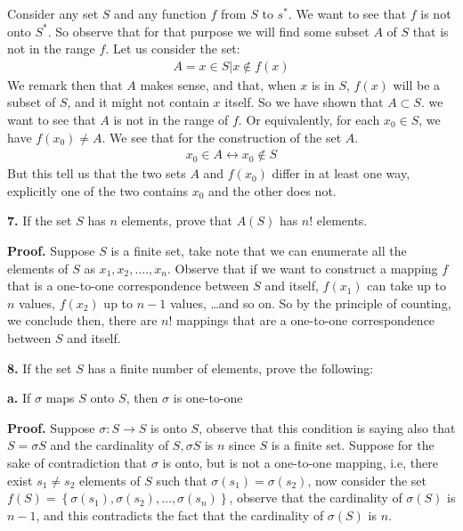 \documentclass[11pt,a4paper]{article}
\begin{document}
Consider any set $S$ and any function $f$ from $S$ to $s^*$. We want to see that $f$ is not onto $S^*$. So observe that for that purpose we will find some subset $A$ of $S$ that is not in the range $f$.
Let us consider the set:
\begin{align*}
A = { x \in S \vert x \not\in f(x)}
\end{align*} 
We remark then that $A$ makes sense, and that, when $x$ is in $S$, $f(x)$ will be a subset of $S$, and it might not contain $x$ itself.
So we have shown that $A \subset S$. we want to see that $A$ is not in the range of $f$. Or equivalently, for each $x_0 \in S$, we have $ f(x_0) \neq A$. We see that for the construction of the set $A$.
\begin{align*}
x_0 \in A \leftrightarrow x_0 \not\in S 
\end{align*}
But this tell us that the two sets $A$ and $f(x_0)$ differ in at least one way, explicitly one of the two contains $x_0$ and the other does not. \par 
\textbf{7.} If the set $S$ has $n$ elements, prove that $A(S)$ has $ n!$ elements. \par  
\textbf{Proof.} Suppose $S$ is a finite set, take note that we can enumerate all the elements of $S$ as $ x_1, x_2,....,x_n$. Observe that if we want to construct a mapping $f$ that is a one-to-one correspondence between $S$ and itself, $f(x_1)$ can take up to $n$ values, $f(x_2)$ up to $n-1$ values, \ldots and so on. So by the principle of counting, we conclude then, there are $n!$ mappings that are a one-to-one correspondence between $S$ and itself. \par 
\textbf{8.} If the set $S$ has a finite number of elements, prove the following: \par
\textbf{a.} If $ \sigma$ maps $S$ onto $S$, then $\sigma$ is one-to-one \par
\textbf{Proof.} Suppose $ \sigma : S \rightarrow S $ is onto $S$, observe that this condition is saying also that $S = \sigma S$ and the cardinality of $ S, \sigma S $ is $n$ since $S$  is a finite set. Suppose for the sake of contradiction that $ \sigma $ is onto, but is not a one-to-one mapping, i.e, there exist $s_1 \neq s_2$ elements of $S$ such that $ \sigma(s_1) = \sigma(s_2) $, now consider the set $ f(S) = \left\lbrace \sigma(s_1), \sigma(s_2), \ldots, \sigma(s_n) \right\rbrace $, observe that the cardinality of $\sigma(S)$ is $ n-1$, and this contradicts the fact that the cardinality of $ \sigma(S) $ is $n$.  \newline
\end{document}
